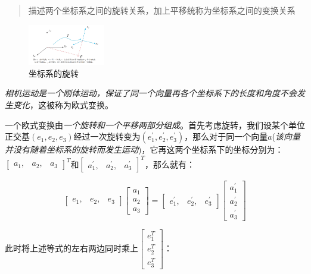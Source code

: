 \begin{quote}
    \centering
    描述两个坐标系之间的旋转关系，加上平移统称为坐标系之间的变换关系
\end{quote}

\begin{figure}[!htbp]
    \centering
    \includegraphics[width=0.3\textwidth]{image/chapter02/坐标系的旋转.png}
    \caption{坐标系的旋转}
\end{figure}

    \emph{相机运动是一个刚体运动，保证了同一个向量再各个坐标系下的长度和角度不会发生变化}，这被称为欧式变换。

    一个欧式变换由\emph{一个旋转和一个平移两部分组成}。首先考虑旋转，我们设某个单位正交基$(e_1, e_2, e_3)$经过一次旋转变为$(e_1^{'}, e_2^{'}, e_3^{'})$，那么对于同一个向量$a$(\emph{该向量并没有随着坐标系的旋转而发生运动})，它再这两个坐标系下的坐标分别为：$\begin{bmatrix}a_1, & a_2, & a_3\end{bmatrix}^T$和$\begin{bmatrix}a_1^{'}, & a_2^{'}, & a_3^{'}\end{bmatrix}^T$，那么就有：

$$
\begin{bmatrix}
    e_1, & e_2, & e_3
\end{bmatrix}
\begin{bmatrix}
    a_1 \\ a_2 \\ a_3
\end{bmatrix} = 
\begin{bmatrix}
    e_1^{'}, & e_2^{'}, & e_3^{'}
\end{bmatrix}
\begin{bmatrix}
    a_1^{'} \\ a_2^{'} \\ a_3^{'}
\end{bmatrix}
$$

    此时将上述等式的左右两边同时乘上$\begin{bmatrix}e_1^{T} \\ e_2^{T} \\ e_3^{T}\end{bmatrix}$：

